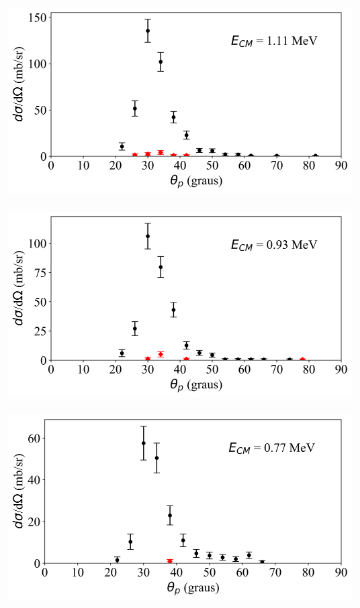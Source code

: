 \documentclass[a4paper,12pt,oneside]{book}
\begin{document}
\begin{figure}[H]
\begin{subfigure}[b]{0.48\textwidth}
        \caption{}
        \label{subfig:dist_ang_y}
    \end{subfigure}%
    \hfill
    \begin{subfigure}[b]{0.48\textwidth}
        \centering
        \includegraphics[scale=0.38, width=1.\columnwidth]{figs/dist_angs/dist_ang_25.png}
        \caption{}
        \label{subfig:dist_ang_z}
    \end{subfigure}
    \begin{subfigure}[b]{0.48\textwidth}
        \centering
        \includegraphics[scale=0.38, width=1.\columnwidth]{figs/dist_angs/dist_ang_26.png}
        \caption{}
        \label{subfig:dist_ang_aa}
    \end{subfigure}%
    \hfill
    \begin{subfigure}[b]{0.48\textwidth}
        \centering
        \includegraphics[scale=0.38, width=1.\columnwidth]{figs/dist_angs/dist_ang_27.png}

\end{subfigure}
\end{figure}
\end{document}
